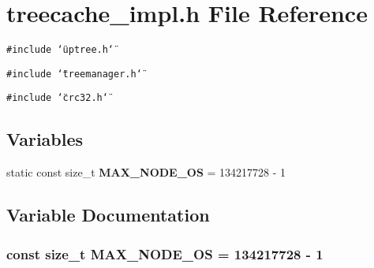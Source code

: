 \section{treecache\_\-impl.h File Reference}
\label{treecache__impl_8h}
{\tt \#include \char`\"{}uptree.h\char`\"{}}\par
{\tt \#include \char`\"{}treemanager.h\char`\"{}}\par
{\tt \#include \char`\"{}crc32.h\char`\"{}}\par
\subsection*{Variables}
\begin{CompactItemize}
\item 
static const size\_\-t {\bf MAX\_\-NODE\_\-OS} = 134217728 - 1
\end{CompactItemize}


\subsection{Variable Documentation}
\subsubsection{\setlength{\rightskip}{0pt plus 5cm}const size\_\-t {\bf MAX\_\-NODE\_\-OS} = 134217728 - 1\hspace{0.3cm}{\tt  [static]}}\label{treecache__impl_8h_a0}


